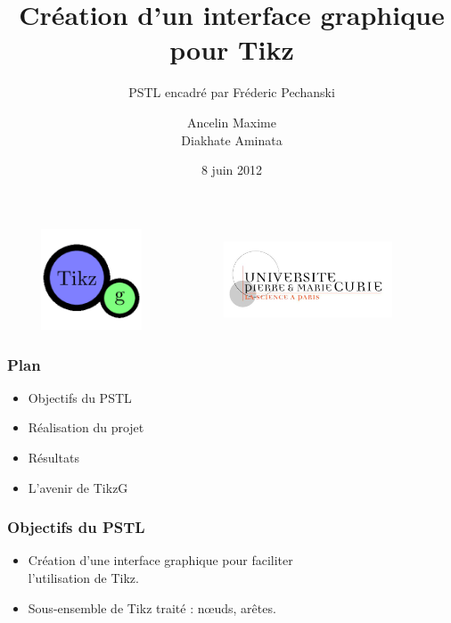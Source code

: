 \documentclass{beamer}
\title[Création d'un interface graphique pour Tikz]{Création d'un interface graphique pour Tikz}
\subtitle{PSTL encadré par Fréderic Pechanski}    %
\author[]{Ancelin Maxime\\Diakhate Aminata}                 %
\institute[UPMC]{M1 Informatique spécialité STL\\UPMC}      %
\date{8 juin 2012}      %
\begin{document}
\newenvironment{violetpar}{\color{violet}}{}
\newenvironment{bluepar}{\par\color{blue}}{\par}
\newenvironment{yellowpar}{\par\color{orange}}{\par}





\begin{frame}
  \titlepage
\includegraphics[width=5cm, height=3cm]{img/logo256.png} \   \ \ \ \ \ \ 
\includegraphics[width=5cm, height=3cm]{img/LogoUPMC.jpg} 
\end{frame}

\begin{frame}
\frametitle{Plan} 

\begin{itemize}

\item Objectifs du PSTL

\item Réalisation du projet

\item Résultats

\item L'avenir de TikzG


\end{itemize}
\end{frame}

\begin{frame}
\frametitle{Objectifs du PSTL} 


\begin{itemize}

\item Création d'une interface graphique pour
faciliter\\ l'utilisation de Tikz.

\item Sous-ensemble de Tikz traité : nœuds,
arêtes.

\end{itemize}
\end{frame}
\end{document}
